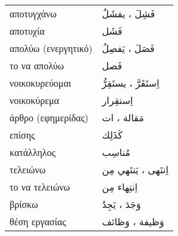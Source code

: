 \documentclass[twocolumn,a4paper]{article}
\newcommand{\ar}[1]{\textarabic{#1}}
\newcommand{\pl}{\raisebox{0.15ex}{\footnotesize ◍}}
\newcommand{\normpl}[1]{\ar{ #1، ات }}
\newcommand{\vrf}{\raisebox{0.15ex}{\footnotesize ◉}}
\newcommand{\mas}{\raisebox{0.15ex}{\footnotesize ◫}}
\begin{document}
\begin{mpsupertabular}{ P{0.5\textwidth} P{0.5\textwidth} }
αποτυγχάνω \vrf              & \ar{ فَشِلَ ، يفشَلُ } \\
αποτυχία \mas                & \ar{ فَشَل } \\
απολύω (ενεργητικό) \vrf     & \ar{ فَصَلَ ، يَفصِلُ } \\ %
το να απολύω \mas            & \ar{ فَصل } \\
νοικοκυρεύομαι \vrf          & \ar{ اِستَقَرَّ ، يستَقِرُّ } \\ %
νοικοκύρεμα \mas             & \ar{ اِستقِرار } \\
άρθρο (εφημερίδας) \pl       & \normpl{ مَقالة } \\
επίσης                       & \ar{ كَذَلِك } \\
κατάλληλος                   & \ar{ مُناسِب } \\
τελειώνω \vrf                & \ar{ اِنتَهى ، يَنتَهي مِن } \\ %
το να τελειώνω \mas          & \ar{ اِنتِهاء مِن } \\
βρίσκω \vrf                  & \ar{ وَجَدَ ، يَجِدُ } \\
θέση εργασίας \pl            & \ar{ وَظيفة ، وَظائف } \\


\end{mpsupertabular}
\end{document}
